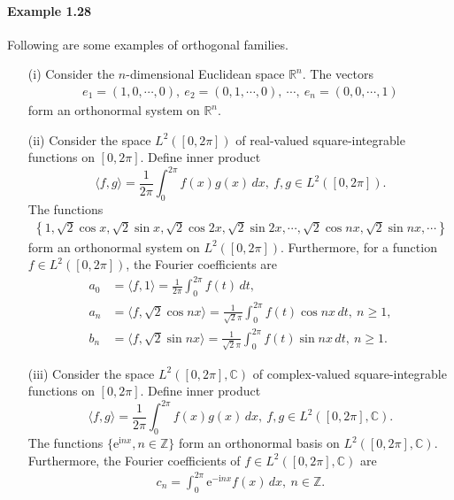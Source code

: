\documentclass{article}
\renewcommand{\i}{\mathrm{i}}
\begin{document}
\paragraph{Example 1.28\label{example:1.28}} Following are some examples of orthogonal families.
\vspace{0.1cm}
\begin{itemize}
\item[(i)] Consider the $n$-dimensional Euclidean space $\mathbb{R}^n$. The vectors
\begin{align*}
	e_1=(1,0,\cdots,0),\ e_2=(0,1,\cdots,0),\ \cdots,\ e_n=(0,0,\cdots,1)
\end{align*}
form an orthonormal system on $\mathbb{R}^n$.
\vspace{0.1cm}
\item[(ii)] Consider the space $L^2([0,2\pi])$ of real-valued square-integrable functions on $[0,2\pi]$. Define inner product $$\langle f,g\rangle =\frac{1}{2\pi}\int_0^{2\pi} f(x)g(x)\,dx,\ f,g\in L^2([0,2\pi]).$$ The functions
\begin{align*}
	\left\{1,\sqrt{2}\cos x,\sqrt{2}\sin x,\sqrt{2}\cos 2x,\sqrt{2}\sin 2x,\cdots,\sqrt{2}\cos nx,\sqrt{2}\sin nx,\cdots\right\}
\end{align*}
form an orthonormal system on $L^2([0,2\pi])$. Furthermore, for a function $f\in L^2([0,2\pi])$, the Fourier coefficients are
\begin{align*}
	a_0 &= \langle f,1\rangle = \frac{1}{2\pi}\int_0^{2\pi} f(t)\,dt,\\ a_n &= \langle f,\sqrt{2}\cos nx\rangle = \frac{1}{\sqrt{2}\pi}\int_0^{2\pi} f(t)\cos nx\,dt,\ n\geq 1,\\
	b_n &= \langle f,\sqrt{2}\sin nx\rangle = \frac{1}{\sqrt{2}\pi}\int_0^{2\pi} f(t)\sin nx\,dt,\ n\geq 1.
\end{align*}
\vspace{0.1cm}
\item[(iii)] Consider the space $L^2([0,2\pi],\mathbb{C})$ of complex-valued square-integrable functions on $[0,2\pi]$. Define inner product $$\langle f,g\rangle =\frac{1}{2\pi}\int_0^{2\pi} f(x)g(x)\,dx,\ f,g\in L^2([0,2\pi],\mathbb{C}).$$ The functions $\{\mathrm{e}^{\i nx},n\in\mathbb{Z}\}$ form an orthonormal basis on $L^2([0,2\pi],\mathbb{C})$. Furthermore, the Fourier coefficients of $f\in L^2([0,2\pi],\mathbb{C})$ are
\begin{align*}
	c_n = \int_0^{2\pi}\mathrm{e}^{-\i nx}f(x)\,dx,\ n\in\mathbb{Z}.
\end{align*}
\end{itemize}
\end{document}
